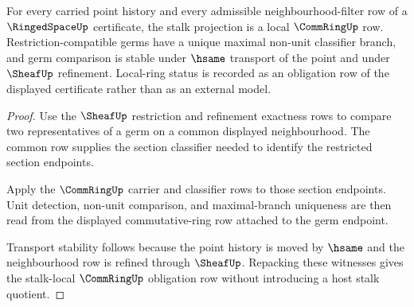 \begin{theorem}\label{thm:ringedspace-stalk-locality-obligation}
For every carried point history and every admissible neighbourhood-filter row of a $\RingedSpaceUp$ certificate, the stalk projection is a local $\CommRingUp$ row. Restriction-compatible germs have a unique maximal non-unit classifier branch, and germ comparison is stable under $\hsame$ transport of the point and under $\SheafUp$ refinement. Local-ring status is recorded as an obligation row of the displayed certificate rather than as an external model.
\end{theorem}
\begin{proof}
Use the $\SheafUp$ restriction and refinement exactness rows to compare two representatives of a germ on a common displayed neighbourhood. The common row supplies the section classifier needed to identify the restricted section endpoints.

Apply the $\CommRingUp$ carrier and classifier rows to those section endpoints. Unit detection, non-unit comparison, and maximal-branch uniqueness are then read from the displayed commutative-ring row attached to the germ endpoint.

Transport stability follows because the point history is moved by $\hsame$ and the neighbourhood row is refined through $\SheafUp$. Repacking these witnesses gives the stalk-local $\CommRingUp$ obligation row without introducing a host stalk quotient.
\end{proof}

